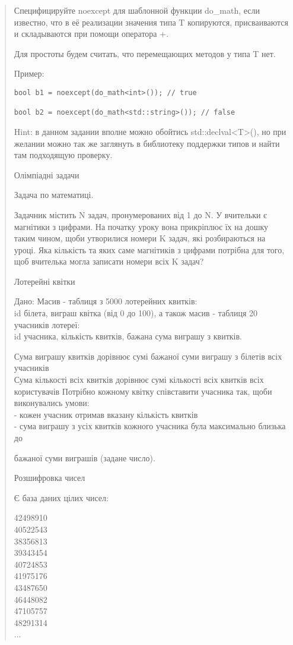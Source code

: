 \documentclass[]{article}
\begin{document}
\begin{quote}
Специфицируйте noexcept для шаблонной функции do\_math, если известно, что в её реализации значения типа T копируются,  присваиваются и складываются при помощи оператора +.

Для простоты будем считать, что перемещающих методов у типа T нет.

Пример:
\begin{verbatim}
bool b1 = noexcept(do_math<int>()); // true

bool b2 = noexcept(do_math<std::string>()); // false
\end{verbatim}

Hint: в данном задании вполне можно обойтись std::declval<T>(), но при желании можно так же заглянуть в библиотеку поддержки типов и найти там подходящую проверку.


Олімпіадні задачи

Задача по математиці.

Задачник містить N задач, пронумерованих від 1 до N. У вчительки є
магнітики з цифрами. На початку уроку вона прикріплює їх на дошку таким
чином, щоби утворилися номери K задач, які розбираються на уроці. Яка
кількість та яких саме магнітиків з цифрами потрібна для того, щоб
вчителька могла записати номери всіх K задач?

Лотерейні квітки

Дано: Масив - таблиця з 5000 лотерейних квитків:\\
id білета, виграш квітка (від 0 до 100), а також масив - таблиця 20
учасників лотереї:\\
id учасника, кількість квитків, бажана сума виграшу з квитків.

Сума виграшу квитків дорівнює сумі бажаної суми виграшу з білетів всіх
учасників\\
Сума кількості всіх квитків дорівнює сумі кількості всіх квитків всіх
користувачів Потрібно кожному квітку співставити учасника так, щоби
виконувались умови:\\
- кожен учасник отримав вказану кількість квитків\\
- сума виграшу з усіх квитків кожного учасника була максимально близька
до

бажаної суми виграшів (задане число).

Розшифровка чисел

Є база даних цілих чисел:

42498910\\
40522543\\
38356813\\
39343454\\
40724853\\
41975176\\
43487650\\
46448082\\
47105757\\
48291314\\
...


\end{quote}
\end{document}
